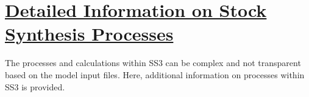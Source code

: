 \pagebreak

\hypertarget{SS3Processes}{}
\section[Detailed Information on Stock Synthesis Processes]{\protect\hyperlink{SS3Processes}{Detailed Information on Stock Synthesis Processes}}

The processes and calculations within SS3 can be complex and not transparent based on the model input files. Here, additional information on processes within SS3 is provided.

